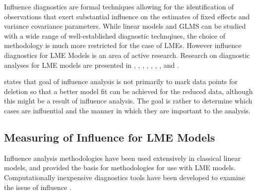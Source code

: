 \documentclass[12pt, a4paper]{report}
\theoremstyle{plain}
\theoremstyle{definition}
\theoremstyle{remark}
\begin{document}
Influence diagnostics are formal techniques allowing for the identification of observations that exert substantial  influence on the estimates of fixed effects and variance covariance parameters.
While linear models and GLMS can be studied with a wide range of well-established diagnostic technqiues, the choice of methodology is much more restricted for the case of LMEs. However
influence diagnostics for LME Models is an area of active research. Research on diagnostic analyses for LME models are presented in \citet{Beckman}, 
\citet{Christensen}, \citet{HildenMinton}, \citet{lesaffre1998local}, \citet{Banerjee1997}, 
\citet{fung2002}, \citet{Demi}, \citet{Zewotir} and \citet{NobreSinger2007, NobreSinger2011}.





\citet{schabenberger} states that goal of influence analysis is not primarily to mark data
points for deletion so that a better model fit can be achieved for the reduced data, although this might be a
result of influence analysis. The goal is rather to determine which cases are influential and the manner in
which they are important to the analysis. 




%

\newpage
\subsection{Measuring of Influence for LME Models}
	Influence analysis methodologies have been used extensively in classical linear models, and provided the basis for methodologies for use with LME models. Computationally inexpensive diagnostics tools have been developed to examine the issue of influence \citep{Zewotir}. 
	
\end{document}
